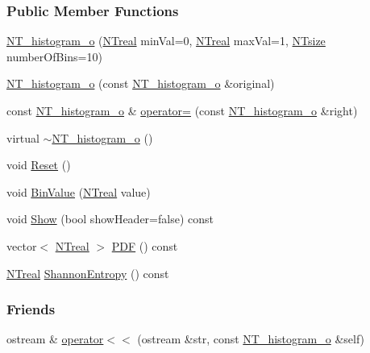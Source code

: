 \subsubsection*{Public Member Functions}
\begin{DoxyCompactItemize}
\item 
\hyperlink{class_n_t__histogram__o_a229f88c21c7527e2cc048c43e9bc10cf}{NT\_\-histogram\_\-o} (\hyperlink{nt__types_8h_a814a97893e9deb1eedcc7604529ba80d}{NTreal} minVal=0, \hyperlink{nt__types_8h_a814a97893e9deb1eedcc7604529ba80d}{NTreal} maxVal=1, \hyperlink{nt__types_8h_a06c124f2e4469769b58230253ce0560b}{NTsize} numberOfBins=10)
\item 
\hyperlink{class_n_t__histogram__o_a26abef4bc37f9f1768913693d69756cd}{NT\_\-histogram\_\-o} (const \hyperlink{class_n_t__histogram__o}{NT\_\-histogram\_\-o} \&original)
\item 
const \hyperlink{class_n_t__histogram__o}{NT\_\-histogram\_\-o} \& \hyperlink{class_n_t__histogram__o_a4e6c0fa95b623834c021e3614b881881}{operator=} (const \hyperlink{class_n_t__histogram__o}{NT\_\-histogram\_\-o} \&right)
\item 
virtual \hyperlink{class_n_t__histogram__o_a7ffbc36700b3c1c97ca4fe4d93debd35}{$\sim$NT\_\-histogram\_\-o} ()
\item 
void \hyperlink{class_n_t__histogram__o_af67149357925545db10594eacf15cc29}{Reset} ()
\item 
void \hyperlink{class_n_t__histogram__o_a26ceff203764c4b288255c0aadd69ac3}{BinValue} (\hyperlink{nt__types_8h_a814a97893e9deb1eedcc7604529ba80d}{NTreal} value)
\item 
void \hyperlink{class_n_t__histogram__o_a2bacbd750700213b4e4b74312982c798}{Show} (bool showHeader=false) const 
\item 
vector$<$ \hyperlink{nt__types_8h_a814a97893e9deb1eedcc7604529ba80d}{NTreal} $>$ \hyperlink{class_n_t__histogram__o_a5f3937357969666b3c07f5ff8da71434}{PDF} () const 
\item 
\hyperlink{nt__types_8h_a814a97893e9deb1eedcc7604529ba80d}{NTreal} \hyperlink{class_n_t__histogram__o_ae3e719124abf849401eb51a2e4489ac0}{ShannonEntropy} () const 
\end{DoxyCompactItemize}
\subsubsection*{Friends}
\begin{DoxyCompactItemize}
\item 
ostream \& \hyperlink{class_n_t__histogram__o_a08205718b05a07ad642674c8315b4941}{operator$<$$<$} (ostream \&str, const \hyperlink{class_n_t__histogram__o}{NT\_\-histogram\_\-o} \&self)
\end{DoxyCompactItemize}


